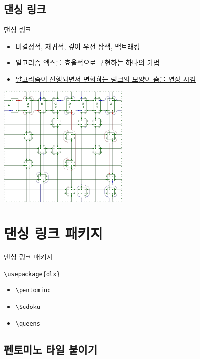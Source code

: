 \documentclass[xcolor=svgnames]{beamer}
\begin{document}
\subsection{댄싱 링크}
%
\begin{frame}{댄싱 링크}
  \begin{itemize}
  \item 비결정적, 재귀적, 깊이 우선 탐색, 백트래킹
  \item 알고리즘 엑스를 효율적으로 구현하는 하나의 기법
  \item \href{https://www.youtube.com/watch?v=pN76VICZiKU&start=100}
    {알고리즘이 진행되면서 변화하는 링크의 모양이 춤을 연상 시킴}
  \end{itemize}
  \vspace{-3mm}
  \begin{center}
    \includegraphics[height=60mm]{imgs/cdance-4.png}
  \end{center}
\end{frame}


\section{댄싱 링크 패키지}

%
\begin{frame}[fragile]{댄싱 링크 패키지}
  \begin{center}
    \verb|\usepackage{dlx}|
  \end{center}
  
  \begin{itemize}
  \item \verb|\pentomino|
  \item \verb|\Sudoku|
  \item \verb|\queens|
  \end{itemize}
\end{frame}


\subsection{펜토미노 타일 붙이기}
\end{document}
